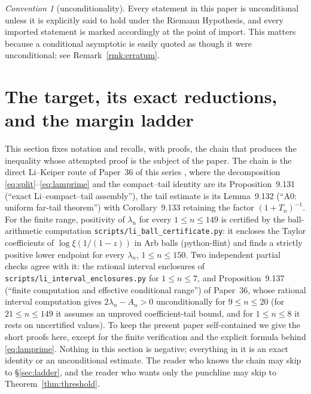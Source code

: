 \documentclass[11pt]{amsart}
\theoremstyle{definition}
\theoremstyle{remark}
\newtheorem{convention}[theorem]{Convention}
\theoremstyle{definition}
\begin{document}
\begin{convention}[unconditionality]\label{conv:cond}
Every statement in this paper is unconditional unless it is explicitly said to hold under the
Riemann Hypothesis, and every imported statement is marked accordingly at the point of import.
This matters because a conditional asymptotic is easily quoted as though it were unconditional;
see Remark~\ref{rmk:erratum}.
\end{convention}

\section{The target, its exact reductions, and the margin ladder}\label{sec:target}

This section fixes notation and recalls, with proofs, the chain that produces the inequality
whose attempted proof is the subject of the paper. The chain is the direct Li--Keiper route of
Paper~36 of this series \cite{Paper36}, where the decomposition \eqref{eq:split}--\eqref{eq:lamprime} and
the compact--tail identity are its Proposition~9.131 (``exact Li--compact--tail assembly''), the tail
estimate is its Lemma~9.132 (``A0: uniform far-tail theorem'') with Corollary~9.133 retaining the factor
$(1+T_n)^{-1}$. For the finite range, positivity of $\lambda_n$ for every $1\le n\le149$ is
certified by the ball-arithmetic computation \texttt{scripts/li\_ball\_certificate.py}: it encloses the
Taylor coefficients of $\log\xi(1/(1-z))$ in Arb balls (python-flint) and finds a strictly positive
lower endpoint for every $\lambda_n$, $1\le n\le150$. Two independent partial checks agree with it: the
rational interval enclosures of \texttt{scripts/li\_interval\_enclosures.py} for $1\le n\le7$, and
Proposition~9.137 (``finite computation and effective conditional range'') of Paper~36, whose rational
interval computation gives $2\lambda_n-A_n>0$ unconditionally for $9\le n\le20$ (for $21\le n\le149$ it
assumes an unproved coefficient-tail bound, and for $1\le n\le8$ it rests on uncertified values). To keep the present paper self-contained we give the short proofs
here, except for the finite verification and the explicit formula behind \eqref{eq:lamprime}. Nothing in this
section is negative; everything in it is an exact identity or an unconditional estimate. The
reader who knows the chain may skip to \S\ref{sec:ladder}, and the reader who wants only the
punchline may skip to Theorem~\ref{thm:threshold}.
\end{document}
